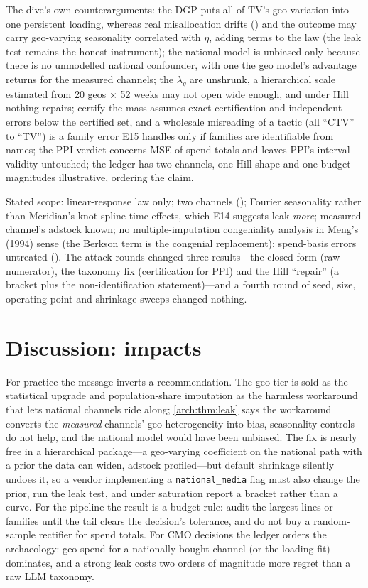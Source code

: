 The dive's own counterarguments: the DGP puts all of TV's geo variation into one persistent loading, whereas real misallocation drifts () and the outcome may carry geo-varying seasonality correlated with $\eta$, adding terms to the law (the leak test remains the honest instrument); the national model is unbiased only because there is no unmodelled national confounder, with one the geo model's advantage returns for the measured channels; the $\lambda_g$ are unshrunk, a hierarchical scale estimated from 20 geos $\times$ 52 weeks may not open wide enough, and under Hill nothing repairs; certify-the-mass assumes exact certification and independent errors below the certified set, and a wholesale misreading of a tactic (all ``CTV'' to ``TV'') is a family error E15 handles only if families are identifiable from names; the PPI verdict concerns MSE of spend totals and leaves PPI's interval validity untouched; the ledger has two channels, one Hill shape and one budget---magnitudes illustrative, ordering the claim.

Stated scope: linear-response law only; two channels (); Fourier seasonality rather than Meridian's knot-spline time effects, which E14 suggests leak \emph{more}; measured channel's adstock known; no multiple-imputation congeniality analysis in Meng's (1994) sense (the Berkson term is the congenial replacement); spend-basis errors untreated (). The attack rounds changed three results---the closed form (raw numerator), the taxonomy fix (certification for PPI) and the Hill ``repair'' (a bracket plus the non-identification statement)---and a fourth round of seed, size, operating-point and shrinkage sweeps changed nothing.

\section{Discussion: impacts}

For practice the message inverts a recommendation. The geo tier is sold as the statistical upgrade and population-share imputation as the harmless workaround that lets national channels ride along; \cref{arch:thm:leak} says the workaround converts the \emph{measured} channels' geo heterogeneity into bias, seasonality controls do not help, and the national model would have been unbiased. The fix is nearly free in a hierarchical package---a geo-varying coefficient on the national path with a prior the data can widen, adstock profiled---but default shrinkage silently undoes it, so a vendor implementing a \texttt{national\_media} flag must also change the prior, run the leak test, and under saturation report a bracket rather than a curve. For the pipeline the result is a budget rule: audit the largest lines or families until the tail clears the decision's tolerance, and do not buy a random-sample rectifier for spend totals. For CMO decisions the ledger orders the archaeology: geo spend for a nationally bought channel (or the loading fit) dominates, and a strong leak costs two orders of magnitude more regret than a raw LLM taxonomy.

